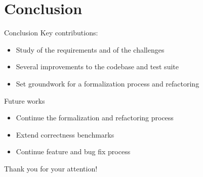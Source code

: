 \documentclass{beamer}
\begin{document}
\section{Conclusion}
\begin{frame}{Conclusion}
Key contributions:
\bigskip
\begin{itemize}
    \item Study of the requirements and of the challenges
    \bigskip
    \item Several improvements to the codebase and test suite
    \bigskip
    \item Set groundwork for a formalization process and refactoring
\end{itemize}

\end{frame}


\begin{frame}{Future works}
\begin{itemize}
    \item Continue the formalization and refactoring process
    \bigskip
    \item Extend correctness benchmarks
    \bigskip
    \item Continue feature and bug fix process
\end{itemize}
\end{frame}


\begin{frame}{}
\centering
Thank you for your attention!
\end{frame}
\end{document}
